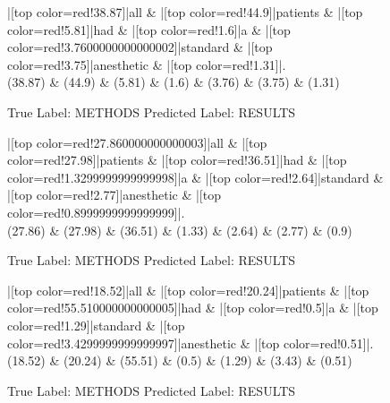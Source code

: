 \documentclass[a4paper, landscape]{article}
\begin{document}
\clearpage
\begin{figure}
\begin{center}
\begin{dependency}
\begin{deptext}
|[top color=red!38.87]|all \& |[top color=red!44.9]|patients \& |[top color=red!5.81]|had \& |[top color=red!1.6]|a \& |[top color=red!3.7600000000000002]|standard \& |[top color=red!3.75]|anesthetic \& |[top color=red!1.31]|.\\
(38.87) \& (44.9) \& (5.81) \& (1.6) \& (3.76) \& (3.75) \& (1.31)\\
\end{deptext}
\end{dependency}
\end{center}
\caption{True Label: METHODS Predicted Label: RESULTS}
\end{figure}
\clearpage
\begin{figure}
\begin{center}
\begin{dependency}
\begin{deptext}
|[top color=red!27.860000000000003]|all \& |[top color=red!27.98]|patients \& |[top color=red!36.51]|had \& |[top color=red!1.3299999999999998]|a \& |[top color=red!2.64]|standard \& |[top color=red!2.77]|anesthetic \& |[top color=red!0.8999999999999999]|.\\
(27.86) \& (27.98) \& (36.51) \& (1.33) \& (2.64) \& (2.77) \& (0.9)\\
\end{deptext}
\end{dependency}
\end{center}
\caption{True Label: METHODS Predicted Label: RESULTS}
\end{figure}
\clearpage
\begin{figure}
\begin{center}
\begin{dependency}
\begin{deptext}
|[top color=red!18.52]|all \& |[top color=red!20.24]|patients \& |[top color=red!55.510000000000005]|had \& |[top color=red!0.5]|a \& |[top color=red!1.29]|standard \& |[top color=red!3.4299999999999997]|anesthetic \& |[top color=red!0.51]|.\\
(18.52) \& (20.24) \& (55.51) \& (0.5) \& (1.29) \& (3.43) \& (0.51)\\
\end{deptext}
\end{dependency}
\end{center}
\caption{True Label: METHODS Predicted Label: RESULTS}
\end{figure}
\end{document}
